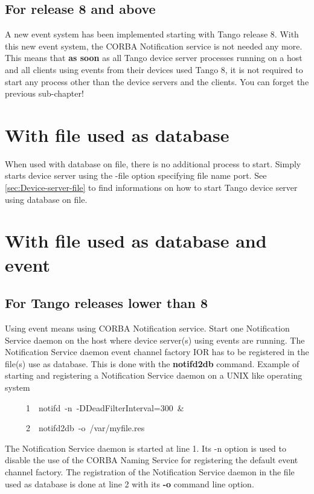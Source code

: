 \subsection{For release 8 and above}

A new event system has been implemented starting with Tango release
8. With this new event system, the CORBA Notification service is not
needed any more. This means that \textbf{as soon} as all Tango device
server processes running on a host and all clients using events from
their devices used Tango 8, it is not required to start any process
other than the device servers and the clients. You can forget the
previous sub-chapter!


\section{With file used as database}

When used with database on file, there is no additional
process to start. Simply starts device server using the -file option
specifying file name port. See \ref{sec:Device-server-file} to find
informations on how to start Tango device server using database on
file.


\section{With file used as database and event}


\subsection{For Tango releases lower than 8}

Using event means using CORBA Notification service. Start one Notification
Service daemon on the host where device
server(s) using events are running. The Notification Service daemon
event channel factory IOR has to be registered in the file(s) use
as database. This is done with the \textbf{notifd2db}
command. Example of starting and registering a Notification Service
daemon on a UNIX like operating system


\begin{lyxcode}
~~~~~1~~notifd~-n~-DDeadFilterInterval=300~\&

~~~~~2~~notifd2db~-o~/var/myfile.res
\end{lyxcode}


The Notification Service daemon is started at line 1. Its \textquotedbl{}-n\textquotedbl{}
option is used to disable the use of the CORBA Naming Service for
registering the default event channel factory. The registration of
the Notification Service daemon in the file used as database is done
at line 2 with its \textbf{-o} command line option.

